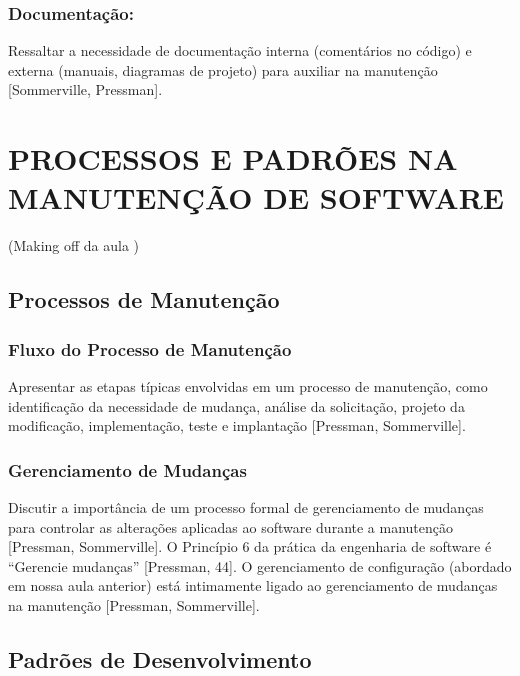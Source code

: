 \documentclass[
]{book}
\begin{document}
\subsection{Documentação:}\label{documentauxe7uxe3o}

Ressaltar a necessidade de documentação interna (comentários no código) e externa (manuais, diagramas de projeto) para auxiliar na manutenção {[}Sommerville, Pressman{]}.

\chapter{PROCESSOS E PADRÕES NA MANUTENÇÃO DE SOFTWARE}\label{processos-e-padruxf5es-na-manutenuxe7uxe3o-de-software}

(Making off da aula )

\section{Processos de Manutenção}\label{processos-de-manutenuxe7uxe3o}

\subsection{Fluxo do Processo de Manutenção}\label{fluxo-do-processo-de-manutenuxe7uxe3o}

Apresentar as etapas típicas envolvidas em um processo de manutenção, como identificação da necessidade de mudança, análise da solicitação, projeto da modificação, implementação, teste e implantação {[}Pressman, Sommerville{]}.

\subsection{Gerenciamento de Mudanças}\label{gerenciamento-de-mudanuxe7as}

Discutir a importância de um processo formal de gerenciamento de mudanças para controlar as alterações aplicadas ao software durante a manutenção {[}Pressman, Sommerville{]}. O Princípio 6 da prática da engenharia de software é ``Gerencie mudanças'' {[}Pressman, 44{]}. O gerenciamento de configuração (abordado em nossa aula anterior) está intimamente ligado ao gerenciamento de mudanças na manutenção {[}Pressman, Sommerville{]}.

\section{Padrões de Desenvolvimento}\label{padruxf5es-de-desenvolvimento}
\end{document}
